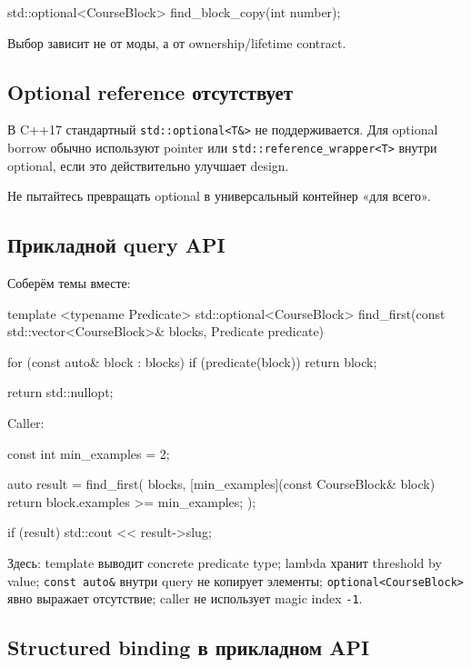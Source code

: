 \begin{cppcode}
std::optional<CourseBlock> find_block_copy(int number);
\end{cppcode}

Выбор зависит не от моды, а от ownership/lifetime contract.

\subsection{Optional reference отсутствует}

В C++17 стандартный \texttt{std::optional<T\&>} не поддерживается.
Для optional borrow обычно используют pointer или
\texttt{std::reference\_wrapper<T>} внутри optional, если это действительно
улучшает design.

Не пытайтесь превращать optional в универсальный контейнер «для всего».

\subsection{Прикладной query API}

Соберём темы вместе:

\begin{cppcode}
template <typename Predicate>
std::optional<CourseBlock>
find_first(const std::vector<CourseBlock>& blocks,
           Predicate predicate) {
    for (const auto& block : blocks) {
        if (predicate(block)) {
            return block;
        }
    }

    return std::nullopt;
}
\end{cppcode}

Caller:

\begin{cppcode}
const int min_examples = 2;

auto result = find_first(
    blocks,
    [min_examples](const CourseBlock& block) {
        return block.examples >= min_examples;
    }
);

if (result) {
    std::cout << result->slug;
}
\end{cppcode}

Здесь:
template выводит concrete predicate type; lambda хранит threshold by value; \texttt{const auto\&} внутри query не копирует элементы; \texttt{optional<CourseBlock>} явно выражает отсутствие; caller не использует magic index \texttt{-1}.

\subsection{Structured binding в прикладном API}

